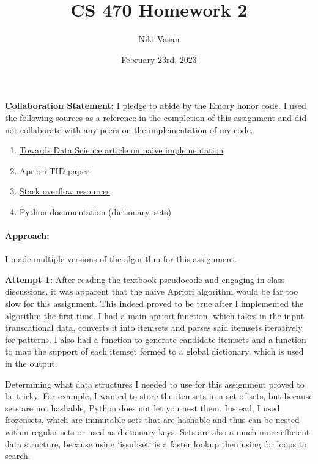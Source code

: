 \documentclass{article}
\title{CS 470 Homework 2}
\author{Niki Vasan}
\date{February 23rd, 2023}
\begin{document}
\maketitle

\textbf{Collaboration Statement:} I pledge to abide by the Emory honor code. I used the following sources as a reference in the completion of this assignment and did not collaborate with any peers on the implementation of my code. 
\begin{enumerate}
    \item \href{https://towardsdatascience.com/apriori-association-rule-mining-explanation-and-python-implementation-290b42afdfc6}{Towards Data Science article on naive implementation}
    \item \href{https://arxiv.org/pdf/1403.3948.pdf} {Apriori-TID paper}
    \item \href{https://stackoverflow.com/questions/28004002/add-set-to-set-and-make-nested-sets} {Stack overflow resources}
    \item Python documentation (dictionary, sets)
\end{enumerate}

\paragraph{\textbf{Approach:}} I made multiple versions of the algorithm for this assignment. 

\textbf{Attempt 1:} After reading the textbook pseudocode and engaging in class discussions, it was apparent that the naive Apriori algorithm would be far too slow for this assignment. This indeed proved to be true after I implemented the algorithm the first time. I had a main apriori function, which takes in the input transcational data, converts it into itemsets and parses said itemsets iteratively for patterns. I also had a function to generate candidate itemsets and a function to map the support of each itemset formed to a global dictionary, which is used in the output.

Determining what data structures I needed to use for this assignment proved to be tricky. For example, I wanted to store the itemsets in a set of sets, but because sets are not hashable, Python does not let you nest them. Instead, I used frozensets, which are immutable sets that are hashable and thus can be nested within regular sets or used as dictionary keys. Sets are also a much more efficient data structure, because using `issubset` is a faster lookup then using for loops to search.
\end{document}
